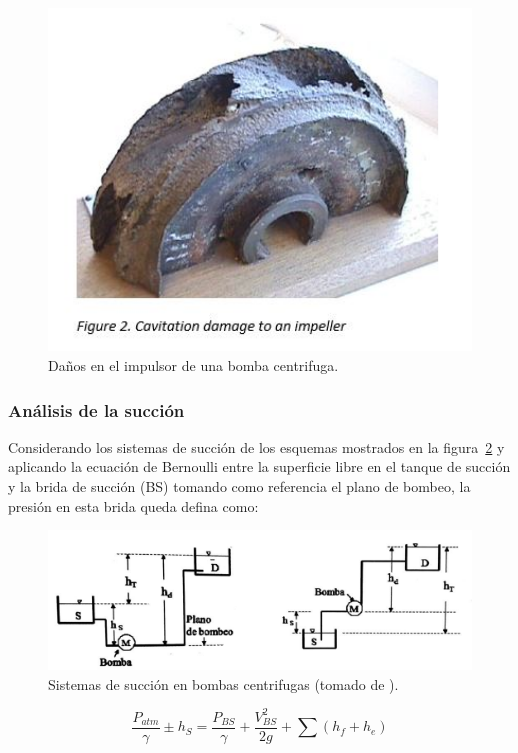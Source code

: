 \documentclass[11pt, oneside]{article}
\begin{document}
\begin{figure}[h]
\centering
\includegraphics[width=12cm]{./figs/bom16a.JPG}
\caption{Da\~nos en el impulsor de una bomba centrifuga.} 
\label{bom16a}
\end{figure}

\subsubsection*{An\'alisis de la succi\'on}
Considerando los sistemas de succi\'on de los esquemas mostrados en la figura~\ref{bom18} y aplicando la ecuaci\'on de Bernoulli entre la superficie libre en el tanque de succi\'on y la brida de succi\'on (BS) tomando como referencia el plano de bombeo, la presi\'on en esta brida queda defina como:

\begin{figure}[h]
\centering
\includegraphics[width=12cm]{./figs/bom18.jpeg}
\caption{Sistemas de succi\'on en bombas centrifugas (tomado de \cite{agudelo2011mecanica}).} 
\label{bom18}
\end{figure}

\begin{equation}
\frac{P_{atm}}{\gamma} \pm h_S = \frac{P_{BS}}{\gamma} + \frac{V_{BS}^2}{2g} + \sum \left(h_f + h_e \right)
\label{boma17}
\end{equation}
\end{document}
